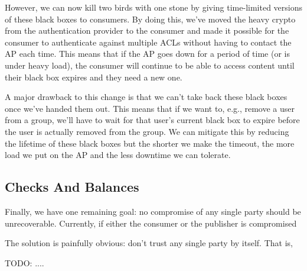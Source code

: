 \documentclass[pdftex,12pt,a4papaer]{report}
\begin{document}
However, we can now kill two birds with one stone by giving time-limited
versions of these black boxes to consumers. By doing this, we've moved the heavy
crypto from the authentication provider to the consumer and made it possible for
the consumer to authenticate against multiple ACLs without having to contact the
AP each time. This means that if the AP goes down for a period of time (or is
under heavy load), the consumer will continue to be able to access content until
their black box expires and they need a new one.

A major drawback to this change is that we can't take back these black boxes
once we've handed them out. This means that if we want to, e.g., remove a user
from a group, we'll have to wait for that user's current black box to expire
before the user is actually removed from the group. We can mitigate this by
reducing the lifetime of these black boxes but the shorter we make the timeout,
the more load we put on the AP and the less downtime we can tolerate.

\subsection{Checks And Balances}

Finally, we have one remaining goal: no compromise of any single party should be
unrecoverable. Currently, if either the consumer or the publisher is
compromised 

The solution is painfully obvious: don't trust any single party
by itself. That is,

TODO: ....
\end{document}
